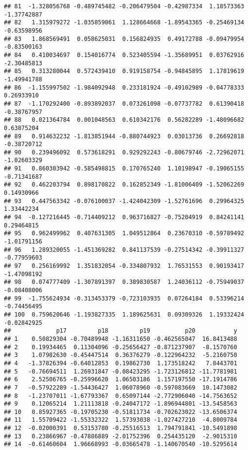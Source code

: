 \documentclass[
]{article}
\begin{document}
\begin{verbatim}
## 81  -1.328056768 -0.489745482 -0.206479504 -0.42987334  1.18573363 -1.37742887
## 82   1.315979272 -1.035859061  1.128664668 -1.89543365 -0.25469134 -0.63598956
## 83   1.868569491  0.058625031  0.156824935  0.49172788 -0.09479954 -0.83500163
## 84   0.410034697  0.154016774  0.523405594 -1.35689951  0.03762916 -2.30485813
## 85   0.313280044  0.572439410  0.919158754 -0.94845895  1.17819619 -1.49941788
## 86  -1.155997502 -1.984092948  0.233181924 -0.49102989 -0.04778333  0.26933910
## 87  -1.170292400 -0.893892037  0.073261098 -0.07737782  0.61390418 -0.38767957
## 88   0.021364784  0.001048563  0.610342176  0.56282289 -1.48096682  0.63875204
## 89   0.914632232 -1.813851944 -0.880744923  0.03013736  0.26692818 -0.38720712
## 90   0.239496092  0.573618291  0.929292243 -0.80679746 -2.72962071 -1.02603329
## 91   0.860303942 -0.585498815  0.170765240  1.10198947 -0.19065155 -0.71341687
## 92   0.462203794  0.898170822  0.162852349 -1.81006409 -1.52062269  0.14930966
## 93   0.447563342 -0.076100037 -1.424042309 -1.52761696  0.29964325  1.33442234
## 94  -0.127216445 -0.714409212  0.963716827 -0.75204919  0.84241141  0.29464815
## 95   0.962499962  0.407631305  1.049512864  0.23670310 -0.59789492 -1.01791156
## 96   1.289320055 -1.451369282  0.841137539 -0.27514342 -0.39911327 -0.77959603
## 97   0.256169992  1.351832054 -0.334807932  1.76531553  0.90193417 -1.47098192
## 98   0.074777409 -1.307891397  0.389830587  1.24036112 -0.75949037 -0.08408006
## 99  -1.755624934 -0.313453379 -0.723103935  0.07264184  0.53396214 -0.74456495
## 100  0.759620646 -1.193827335  1.189625631  0.09309326  1.19332424 -0.02842925
##             p17         p18         p19          p20           y
## 1    0.50829304 -0.70489948 -1.16311650 -0.462565047  16.8413488
## 2    0.19934465  0.11304096 -0.25656427 -0.871237907  -8.1570760
## 3    1.07982630 -0.45447514  0.36376279 -0.122964232  -5.2160750
## 4   -1.37826394 -0.64012853  0.19862730  1.173518242   7.8443701
## 5   -0.76694511  1.26931847 -0.08423295 -1.723126812 -11.7781981
## 6    2.52506765 -0.25996620  1.06503186  1.157197550 -17.1914786
## 7   -0.57922289 -1.54436427  1.06078960 -0.597083669  10.1473082
## 8   -1.23707011 -1.67793367  0.65097144 -2.772906040 -14.7563652
## 9    0.12065214  1.21113818 -0.24047172 -1.896944801 -13.5458563
## 10   0.85927365 -0.19705230 -0.51811734 -0.702623022 -13.6506374
## 11   1.55709422 -1.55332322  1.57393038 -1.027427210  -4.8009784
## 12  -0.02000391  0.53153780 -0.25516513  1.794791841 -10.5491898
## 13   0.23866967 -0.47886889 -2.01752396  0.254435120  -2.9015310
## 14  -0.61460604  1.96668993 -0.03665478 -1.140670540 -10.5295614

\end{verbatim}
\end{document}
